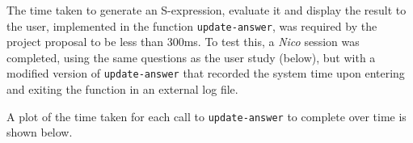\documentclass[12pt,twoside,notitlepage,xetex]{report}
\begin{document}
The time taken to generate an S-expression, evaluate it and display the result to the user, implemented in the function \verb¬update-answer¬, was required by the project proposal to be less than 300ms.  To test this, a \emph{Nico} session was completed, using the same questions as the user study (below), but with a modified version of \verb¬update-answer¬ that recorded the system time upon entering and exiting the function in an external log file.

A plot of the time taken for each call to \verb¬update-answer¬ to complete over time is shown below.

\begin{center}
\begin{figure}[H]
\begin{center}
\\
\subfloat[]{
}
\end{center}
\end{figure}
\end{center}
\end{document}
